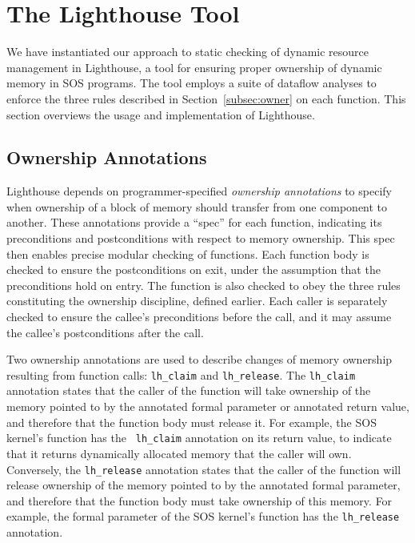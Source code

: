 \section{The Lighthouse Tool}
\label{sec:alg}



We have instantiated our approach to static checking of dynamic resource
management in Lighthouse, a tool for ensuring proper ownership of dynamic
memory in SOS programs.
%
The tool employs a suite of dataflow analyses to enforce the three rules
described in Section~\ref{subsec:owner} on each function.
%
This section overviews the usage and implementation of Lighthouse.



\subsection{Ownership Annotations}


Lighthouse depends on programmer-specified {\em ownership annotations} to
specify when ownership of a block of memory should transfer from one
component to another.
%
These annotations provide a ``spec'' for each function, indicating its
preconditions and postconditions with respect to memory ownership.  
%
This spec then enables precise modular checking of functions.  
%
Each function body is checked to ensure the postconditions on exit, under
the assumption that the preconditions hold on entry.  
%
The function is also checked to obey the three rules constituting the
ownership discipline, defined earlier.  
%
Each caller is separately checked to ensure the callee's preconditions
before the call, and it may assume the callee's postconditions after the
call.



Two ownership annotations are used to describe changes of memory ownership
resulting from function calls: {\tt lh\_claim} and {\tt lh\_release}.
%
The {\tt lh\_claim} annotation states that the caller of the function will
take ownership of the memory pointed to by the annotated formal parameter or
annotated return value, and therefore that the function body must release
it.
%
For example, the SOS kernel's  function has the {\tt
lh\_claim} annotation on its return value, to indicate that it returns
dynamically allocated memory that the caller will own.
%
Conversely, the {\tt lh\_release} annotation states that the caller of the
function will release ownership of the memory pointed to by the annotated
formal parameter, and therefore that the function body must take ownership
of this memory.
%
For example, the formal parameter of the SOS kernel's 
function has the {\tt lh\_release} annotation.



